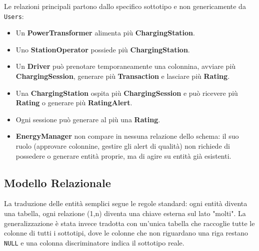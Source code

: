 Le relazioni principali partono dallo specifico sottotipo e non genericamente da \texttt{Users}:

\begin{itemize}
    \item Un \textbf{PowerTransformer} alimenta più \textbf{ChargingStation}.
    \item Uno \textbf{StationOperator} possiede più \textbf{ChargingStation}.
    \item Un \textbf{Driver} può prenotare temporaneamente una colonnina, avviare più \textbf{ChargingSession}, generare più \textbf{Transaction} e lasciare più \textbf{Rating}.
    \item Una \textbf{ChargingStation} ospita più \textbf{ChargingSession} e può ricevere più \textbf{Rating} o generare più \textbf{RatingAlert}.
    \item Ogni sessione può generare al più una \textbf{Rating}.
    \item \textbf{EnergyManager} non compare in nessuna relazione dello schema: il suo ruolo (approvare colonnine, gestire gli alert di qualità) non richiede di possedere o generare entità proprie, ma di agire su entità già esistenti.
\end{itemize}

\subsection{Modello Relazionale}

La traduzione delle entità semplici segue le regole standard: ogni entità diventa una tabella, ogni relazione (1,n) diventa una chiave esterna sul lato "molti". La generalizzazione è stata invece tradotta con un'unica tabella che raccoglie tutte le colonne di tutti i sottotipi, dove le colonne che non riguardano una riga restano \texttt{NULL} e una colonna discriminatore indica il sottotipo reale.

